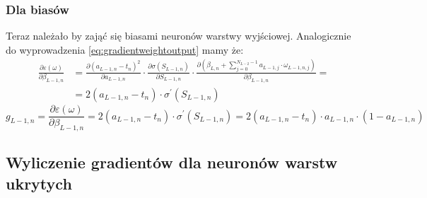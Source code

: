 \documentclass[]{article}
\begin{document}
		\subsubsection{Dla biasów}
			Teraz należało by zająć się biasami neuronów warstwy wyjściowej. Analogicznie do wyprowadzenia \ref{eq:gradientweightoutput} mamy że:
			\begin{equation} \label{eq:gradientbiasoutput}
				\begin{split}
					\frac{ \partial \varepsilon\left( \omega \right) }{ \partial \beta_{L-1,n} } &=
					 \frac{ \partial \left( a_{L-1,n} - t_{n} \right)^{2} }{ \partial a_{L-1,n} } \cdot \frac{ \partial \sigma\left( S_{L-1,n} \right) }{ \partial S_{L-1,n} } \cdot \frac{ \partial \left( \beta_{L,n} + \sum\limits_{j=0}^{ N_{L-2}-1 } a_{L-1,j} \cdot \omega_{L-1,n,j} \right) }{ \partial \beta_{L-1,n} } = \\
					 &= 2\left( a_{L-1,n} - t_{n} \right) \cdot \sigma^{\prime}\left( S_{L-1,n} \right)
				\end{split}
			\end{equation}
			\begin{equation}
				g_{L-1,n} = \frac{ \partial \varepsilon\left( \omega \right) }{ \partial \beta_{L-1,n} } = 2\left( a_{L-1,n} - t_{n} \right) \cdot \sigma^{\prime}\left( S_{L-1,n} \right) = 2\left( a_{L-1,n} - t_{n} \right) \cdot a_{L-1,n} \cdot \left( 1 - a_{L-1,n} \right)
			\end{equation}
			
	\subsection{Wyliczenie gradientów dla neuronów warstw ukrytych}
\end{document}
